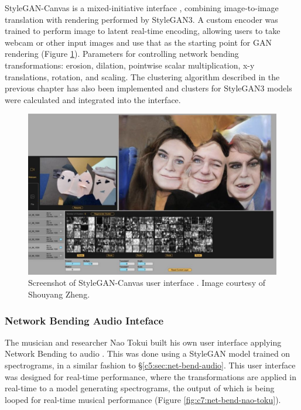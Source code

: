 StyleGAN-Canvas is a mixed-initiative interface \citep{zheng2023stylegan}, combining image-to-image translation with rendering performed by StyleGAN3. 
A custom encoder was trained to perform image to latent real-time encoding, allowing users to take webcam or other input images and use that as the starting point for GAN rendering (Figure \ref{fig:c7:stylegan-canvas}). 
Parameters for controlling network bending transformations:  erosion, dilation, pointwise scalar multiplication, x-y translations, rotation, and scaling.
The clustering algorithm described in the previous chapter has also been implemented and clusters for StyleGAN3 models were calculated and integrated into the interface.

\begin{figure}[!htb]
    \centering
    \captionsetup{justification=centering}
    \includegraphics[width=1\textwidth]{figures/c7_impact/net-bend-technical/stylegan-canvas.png}
    \caption[StyleGAN-Canvas user interface]{Screenshot of StyleGAN-Canvas user interface \citep{zheng2023stylegan}. Image courtesy of Shouyang Zheng.}
    \label{fig:c7:stylegan-canvas}
\end{figure}

\subsubsection{Network Bending Audio Inteface}
\label{c7:subsubsec:naotokui}

The musician and researcher Nao Tokui built his own user interface applying Network Bending to audio \cite{tokui2023bending}. 
This was done using a StyleGAN model trained on spectrograms, in a similar fashion to \S \ref{c5:sec:net-bend-audio}.
This user interface was designed for real-time performance, where the transformations are applied in real-time to a model generating spectrograms, the output of which is being looped for real-time musical performance (Figure \ref{fig:c7:net-bend-nao-toku}).

